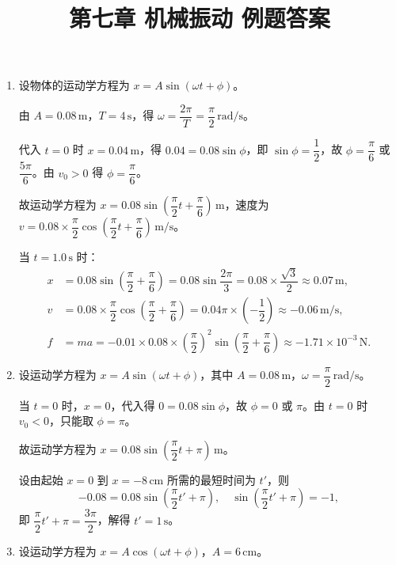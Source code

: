 \documentclass{article}
\begin{document}
\title{第七章 机械振动 例题答案}
\maketitle

\begin{enumerate}
\item 设物体的运动学方程为 $x=A\sin(\omega t+\phi)$。

由 $A=0.08\,\mathrm{m}$，$T=4\,\mathrm{s}$，得 $\omega=\dfrac{2\pi}{T}=\dfrac{\pi}{2}\,\mathrm{rad/s}$。

代入 $t=0$ 时 $x=0.04\,\mathrm{m}$，得 $0.04=0.08\sin\phi$，即 $\sin\phi=\dfrac{1}{2}$，故 $\phi=\dfrac{\pi}{6}$ 或 $\dfrac{5\pi}{6}$。由 $v_0>0$ 得 $\phi=\dfrac{\pi}{6}$。

故运动学方程为 $x=0.08\sin\left(\dfrac{\pi}{2}t+\dfrac{\pi}{6}\right)\,\mathrm{m}$，速度为 $v=0.08\times\dfrac{\pi}{2}\cos\left(\dfrac{\pi}{2}t+\dfrac{\pi}{6}\right)\,\mathrm{m/s}$。

当 $t=1.0\,\mathrm{s}$ 时：
\begin{align*}
x &= 0.08\sin\left(\dfrac{\pi}{2}+\dfrac{\pi}{6}\right) = 0.08\sin\dfrac{2\pi}{3} = 0.08\times\dfrac{\sqrt{3}}{2} \approx 0.07\,\mathrm{m},\\
v &= 0.08\times\dfrac{\pi}{2}\cos\left(\dfrac{\pi}{2}+\dfrac{\pi}{6}\right) = 0.04\pi\times\left(-\dfrac{1}{2}\right) \approx -0.06\,\mathrm{m/s},\\
f &= ma = -0.01\times 0.08\times\left(\dfrac{\pi}{2}\right)^2\sin\left(\dfrac{\pi}{2}+\dfrac{\pi}{6}\right) \approx -1.71\times 10^{-3}\,\mathrm{N}.
\end{align*}

\item 设运动学方程为 $x=A\sin(\omega t+\phi)$，其中 $A=0.08\,\mathrm{m}$，$\omega=\dfrac{\pi}{2}\,\mathrm{rad/s}$。

当 $t=0$ 时，$x=0$，代入得 $0=0.08\sin\phi$，故 $\phi=0$ 或 $\pi$。由 $t=0$ 时 $v_0<0$，只能取 $\phi=\pi$。

故运动学方程为 $x=0.08\sin\left(\dfrac{\pi}{2}t+\pi\right)\,\mathrm{m}$。

设由起始 $x=0$ 到 $x=-8\,\mathrm{cm}$ 所需的最短时间为 $t'$，则
\[
-0.08 = 0.08\sin\left(\dfrac{\pi}{2}t'+\pi\right),\quad \sin\left(\dfrac{\pi}{2}t'+\pi\right)=-1,
\]
即 $\dfrac{\pi}{2}t'+\pi=\dfrac{3\pi}{2}$，解得 $t'=1\,\mathrm{s}$。

\item 设运动学方程为 $x=A\cos(\omega t+\phi)$，$A=6\,\mathrm{cm}$。


\end{enumerate}
\end{document}
